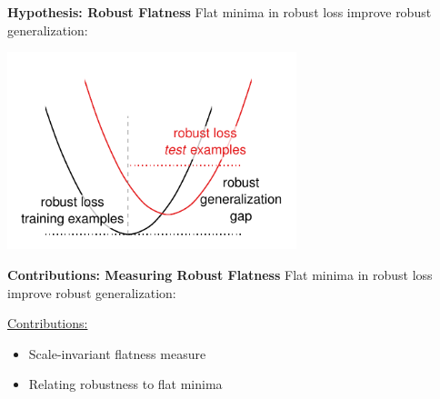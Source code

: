 \documentclass[64pt,aspectratio=169]{beamer}
\begin{document}
	\begin{frame}[t]{\bfseries Hypothesis: Robust Flatness}
		\Large
		Flat minima in robust loss improve robust generalization:
		
		\begin{center}
			\includegraphics[height=5.75cm,clip,trim={0cm 0cm 0cm 1cm}]{fig/main_illustration2.pdf}
		\end{center}
	\end{frame}
	
	\begin{frame}[t]{\bfseries Contributions: Measuring Robust Flatness}
		\Large
		Flat minima in robust loss improve robust generalization:
		\vspace*{-0.25cm}
		
		\begin{center}
		\end{center}
		
		\vspace*{-0.5cm}
		\underline{Contributions:}
		\begin{itemize}
			\item Scale-invariant flatness measure
			\item Relating robustness to flat minima
		\end{itemize}
	\end{frame}
	
\end{document}
